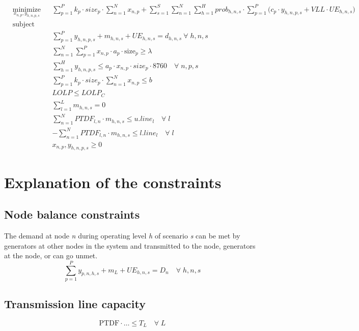 \documentclass[10pt]{amsart}
\begin{document}
\begin{equation*}
\begin{aligned}
& \underset{x_{n,p}, y_{h,n,p,s}}{\text{minimize}} & & \sum_{p=1}^{P} k_{p}\cdot size_{p}\cdot \sum_{n=1}^{N} x_{n,p} + \sum_{s=1}^{S} \sum_{n=1}^{N} \sum_{h=1}^{H} prob_{h,n,s} \cdot \sum_{p=1}^{P} \Big(c_{p}\cdot y_{h,n,p,s} + \textit{VLL} \cdot \textit{UE}_{h,n,s} \Big)\\
& \text{subject to} & & \\
& && \sum_{p=1}^{P} y_{h,n,p,s} + m_{h,n,s} + \textit{UE}_{h,n,s} = d_{h,n,s} \ \forall \; h,n,s \\
& && \sum_{n=1}^{N}\sum_{p=1}^{P} x_{n,p} \cdot a_{p} \cdot \text{size}_{p} \geq \lambda \\
& &&\sum_{h=1}^{H} y_{h,n,p,s} \leq a_{p}\cdot x_{n,p}\cdot size_{p} \cdot 8760 \quad \forall \; n,p,s \\
& &&\sum_{p=1}^{P} k_{p} \cdot size_{p} \cdot \sum_{n=1}^{N} x_{n,p} \leq b \\
& &&LOLP \leq LOLP_{C} \\
& &&\sum_{l=1}^{L} m_{h,n,s} = 0 \\ 
& &&\sum_{n=1}^{N} \textit{PTDF}_{l,n} \cdot m_{h,n,s} \leq \textit{u.line}_{l} \quad \forall \; l \\
& &&-\sum_{n=1}^{N} \textit{PTDF}_{l,n} \cdot m_{h,n,s} \leq \textit{l.line}_{l} \quad \forall \; l \\
& && x_{n,p}, y_{h,n,p,s} \geq 0
\end{aligned}
\end{equation*}

\section{Explanation of the constraints}
\subsection{Node balance constraints}
The demand at node \textit{n} during operating level \textit{h} of scenario \textit{s} can be met by generators at other nodes in the system and transmitted to the node, generators at the node, or can go unmet. 
\begin{equation}
\sum_{p=1}^{P} y_{p,n,h,s} + m_{L} + \textit{UE}_{h,n,s}= D_{n} \quad \forall \; h,n,s
\end{equation}
\subsection{Transmission line capacity}
\begin{equation}
\text{PTDF}\cdot \ldots \leq T_{L} \quad \forall \; L
\end{equation}
\end{document}
